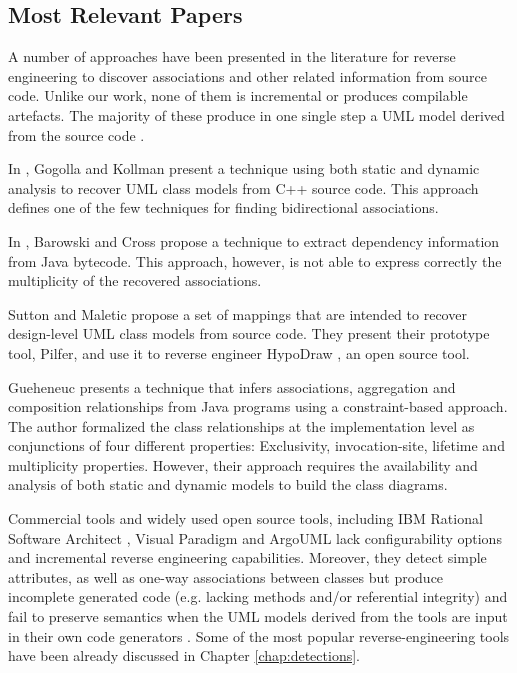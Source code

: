 \subsection{Most Relevant Papers}

A number of approaches have been presented in the literature for reverse engineering to discover associations and other related information from source code. Unlike our work, none of them is incremental or produces compilable artefacts. The majority of these produce in one single step a UML model derived from the source code \cite{Nelson1996}.

In \cite{Kollmann2001}, Gogolla and Kollman present a technique using both static and dynamic analysis to recover UML class models from C++ source code. This approach defines one of the few techniques for finding bidirectional associations.

In \cite{Barowski}, Barowski and Cross propose a technique to extract dependency information from Java bytecode. This approach, however, is not able to express correctly the multiplicity of the recovered associations.

Sutton and Maletic \cite{Sutton2007} propose a set of mappings that are intended to recover design-level UML class models from source code. They present their prototype tool, Pilfer, and use it to reverse engineer HypoDraw \cite{Hypodraw}, an open source tool.


Gueheneuc \cite{GueheneucSystematic} presents a technique that infers associations, aggregation and composition relationships from Java programs using a constraint-based approach. 
The author formalized the class relationships at the implementation level as conjunctions of four different properties: Exclusivity, invocation-site, lifetime and multiplicity properties. 
However, their approach requires the availability and analysis of both static and dynamic models to build the class diagrams.

Commercial tools and widely used open source tools, including IBM Rational Software Architect \cite{ROSE}, Visual Paradigm \cite{VisualParadigm} and ArgoUML \cite{ArgoUML} lack configurability options and incremental reverse engineering capabilities. Moreover, they detect simple attributes, as well as one-way associations between classes but produce incomplete generated code (e.g. lacking methods and/or referential integrity) and fail to preserve semantics when the UML models derived from the tools are input in their own code generators \cite{kollmanToolsCurrent}. Some of the most popular reverse-engineering tools have been already discussed in Chapter \ref{chap:detections}.

